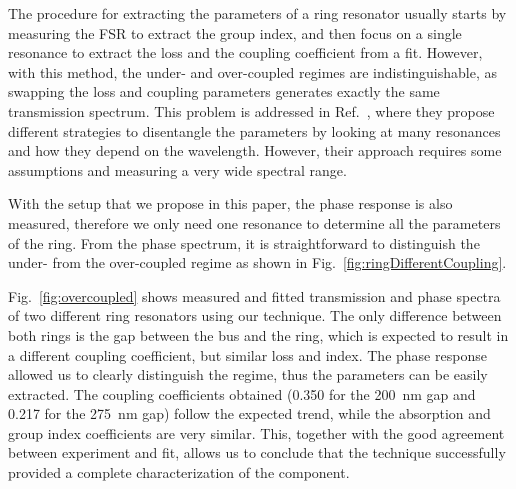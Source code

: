 \documentclass[journal]{IEEEtran}
\begin{document}
The procedure for extracting the parameters of a ring resonator usually starts by measuring the FSR to extract the group index, and then focus on a single resonance to extract the loss and the coupling coefficient from a fit.
However, with this method, the under- and over-coupled regimes are indistinguishable, as swapping the loss and coupling parameters generates exactly the same transmission spectrum.
This problem is addressed in Ref.~\cite{McKinnon2009}, where they propose different strategies to disentangle the parameters by looking at many resonances and how they depend on the wavelength.
However, their approach requires some assumptions and measuring a very wide spectral range.
 
With the setup that we propose in this paper, the phase response is also measured, therefore we only need one resonance to determine all the parameters of the ring.
From the phase spectrum, it is straightforward to distinguish the under- from the over-coupled regime as shown in Fig.~\ref{fig:ringDifferentCoupling}.

Fig.~\ref{fig:overcoupled} shows measured and fitted transmission and phase spectra of two different ring resonators using our technique.
The only difference between both rings is the gap between the bus and the ring, which is expected to result in a different coupling coefficient, but similar loss and index.
The phase response allowed us to clearly distinguish the regime, thus the parameters can be easily extracted.
The coupling coefficients obtained (0.350 for the 200~nm gap and 0.217 for the 275~nm gap) follow the expected trend, while the absorption and group index coefficients are very similar.
This, together with the good agreement between experiment and fit, allows us to conclude that the technique successfully provided a complete characterization of the component.
\end{document}
